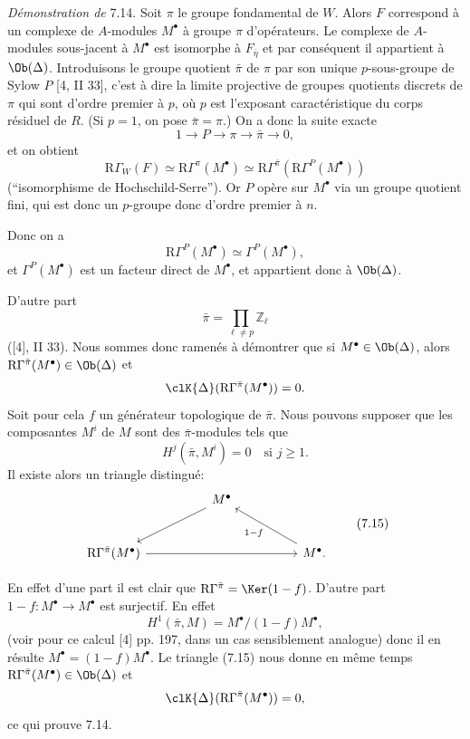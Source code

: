 \emph{Démonstration de} 7.14. Soit $\pi$ le groupe fondamental de $W$. Alors $F$ correspond à un complexe de $A$-modules $M^\bullet$ à groupe $\pi$ d'opérateurs. Le complexe de $A$-modules sous-jacent à $M^\bullet$ est isomorphe à $F_{\bar\eta}$ et par conséquent il appartient à $\Ob(\Delta)$. Introduisons le groupe quotient $\bar\pi$ de $\pi$ par son unique $p$-sous-groupe de Sylow $P$ [4, II 33], c'est à dire la limite projective de groupes quotients discrets de $\pi$ qui sont d'ordre premier à $p$, où $p$ est l'exposant caractéristique du corps résiduel de $R$. (Si $p=1$, on pose $\bar\pi=\pi$.) On a donc la suite exacte
\[
1\longrightarrow P\longrightarrow \pi\longrightarrow \bar\pi\longrightarrow0,
\]
et on obtient
\[
\mathrm{R}\Gamma_W(F)\simeq \mathrm{R}\Gamma^\pi(M^\bullet)
\simeq \mathrm{R}\Gamma^{\bar\pi}(\mathrm{R}\Gamma^P(M^\bullet))
\]
(``isomorphisme de Hochschild-Serre''). Or $P$ opère sur $M^\bullet$ via un groupe quotient fini, qui est donc un $p$-groupe donc d'ordre premier à $n$.

Donc on a
\[
\mathrm{R}\Gamma^P(M^\bullet)\simeq \Gamma^P(M^\bullet),
\]
et $\Gamma^P(M^\bullet)$ est un facteur direct de $M^\bullet$, et appartient donc à $\Ob(\Delta)$.

D'autre part
\[
\bar\pi=\prod_{\ell\ne p}\mathbb{Z}_\ell
\]
([4], II 33). Nous sommes donc ramenés à démontrer que si $M^\bullet\in\Ob(\Delta)$, alors $\mathrm{R}\Gamma^{\bar\pi}(M^\bullet)\in\Ob(\Delta)$ et
\[
\clK{\Delta}(\mathrm{R}\Gamma^{\bar\pi}(M^\bullet))=0.
\]
Soit pour cela $f$ un générateur topologique de $\bar\pi$. Nous pouvons supposer que les composantes $M^i$ de $M$ sont des $\bar\pi$-modules tels que
\[
H^j(\bar\pi,M^i)=0\quad\text{si }j\ge1.
\]
Il existe alors un triangle distingué:
\[
\begin{tikzcd}[column sep=huge,row sep=large]
& M^\bullet \arrow[dl] &\\
\mathrm{R}\Gamma^{\bar\pi}(M^\bullet) \arrow[rr] && M^\bullet \arrow[ul,"1-f"].
\end{tikzcd}
\tag{7.15}
\]

En effet d'une part il est clair que $\mathrm{R}\Gamma^{\bar\pi}=\Ker(1-f)$. D'autre part $1-f:M^\bullet\to M^\bullet$ est surjectif. En effet
\[
H^1(\bar\pi,M)=M^\bullet/(1-f)M^\bullet,
\]
(voir pour ce calcul [4] pp. 197, dans un cas sensiblement analogue) donc il en résulte $M^\bullet=(1-f)M^\bullet$. Le triangle (7.15) nous donne en même temps $\mathrm{R}\Gamma^{\bar\pi}(M^\bullet)\in\Ob(\Delta)$ et
\[
\clK{\Delta}(\mathrm{R}\Gamma^{\bar\pi}(M^\bullet))=0,
\]
ce qui prouve 7.14.

